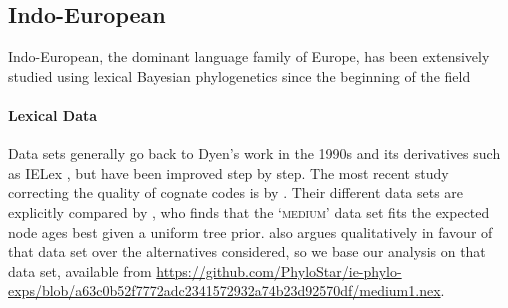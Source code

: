 \documentclass[]{rsos}%
\begin{document}
\subsection{Indo-European}\label{s:indoeuropean}
Indo-European, the dominant language family of Europe, has been extensively studied using lexical Bayesian phylogenetics since the beginning
of the field
\parencite{bouckaert2012mapping,chang2015ancestryconstrained,gray2003language,holm2017steppe,rama2018three,willems2016using}

\paragraph{Lexical Data}
Data sets generally go back to Dyen's work \parencite{dyen1992indoeuropean,dyen1997comparative} in the 1990s and its derivatives such as IELex \parencite{ielex},
but have been improved
step by step. The most recent study correcting
the quality of cognate codes is by \textcite{chang2015ancestryconstrained}. Their different data sets are explicitly compared by \textcite{rama2018three}, who finds that the
‘\textsc{medium}’ data set fits the expected node ages best given a uniform tree prior.  also argues qualitatively in favour of
that data set over the alternatives considered, so we base our analysis on that data set, available from
\url{https://github.com/PhyloStar/ie-phylo-exps/blob/a63c0b52f7772adc2341572932a74b23d92570df/medium1.nex}.
\end{document}
